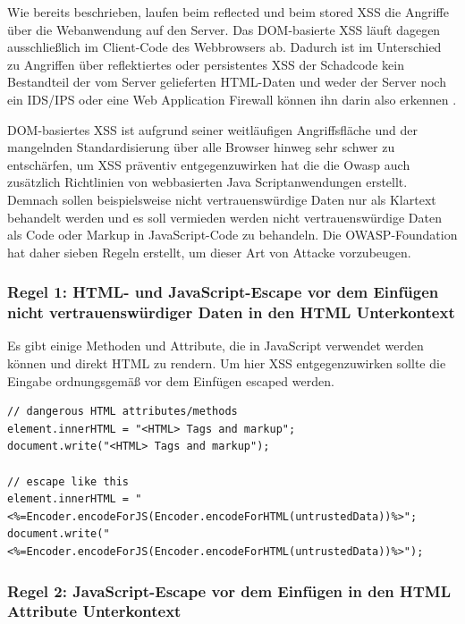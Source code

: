 Wie bereits beschrieben, laufen beim reflected und beim stored XSS die Angriffe über die Webanwendung auf den Server. Das DOM-basierte XSS läuft dagegen ausschließlich im Client-Code des Webbrowsers ab. Dadurch ist im Unterschied zu Angriffen über reflektiertes oder persistentes XSS der Schadcode kein Bestandteil der vom Server gelieferten HTML-Daten und weder der Server noch ein IDS/IPS oder eine Web Application Firewall können ihn darin also erkennen \autocite{owasp2020}.

DOM-basiertes XSS ist aufgrund seiner weitläufigen Angriffsfläche und der mangelnden Standardisierung über alle Browser hinweg sehr schwer zu entschärfen, um XSS präventiv entgegenzuwirken hat die die Owasp auch zusätzlich Richtlinien von webbasierten Java Scriptanwendungen erstellt. Demnach sollen beispielsweise nicht vertrauenswürdige Daten nur als Klartext behandelt werden und es soll vermieden werden nicht vertrauenswürdige Daten als Code oder Markup in JavaScript-Code zu behandeln. Die OWASP-Foundation hat daher sieben Regeln erstellt, um dieser Art von Attacke vorzubeugen.

\subsubsection{Regel 1: HTML- und JavaScript-Escape vor dem Einfügen nicht vertrauenswürdiger Daten in den HTML Unterkontext}

Es gibt einige Methoden und Attribute, die in JavaScript verwendet werden können und direkt HTML zu rendern. Um hier XSS entgegenzuwirken sollte die Eingabe ordnungsgemäß vor dem Einfügen escaped werden.

\begin{lstlisting}[numbers=none, caption={Regel 1 - HTML- und JavaScript-Escape vor dem Einfügen nicht vertrauenswürdiger Daten}, label=Beispiel HTML- und JavaScript-Escape]
// dangerous HTML attributes/methods
element.innerHTML = "<HTML> Tags and markup";
document.write("<HTML> Tags and markup");

// escape like this
element.innerHTML = "<%=Encoder.encodeForJS(Encoder.encodeForHTML(untrustedData))%>";
document.write("<%=Encoder.encodeForJS(Encoder.encodeForHTML(untrustedData))%>");
\end{lstlisting}

\subsubsection{Regel 2: JavaScript-Escape vor dem Einfügen in den HTML Attribute Unterkontext}

